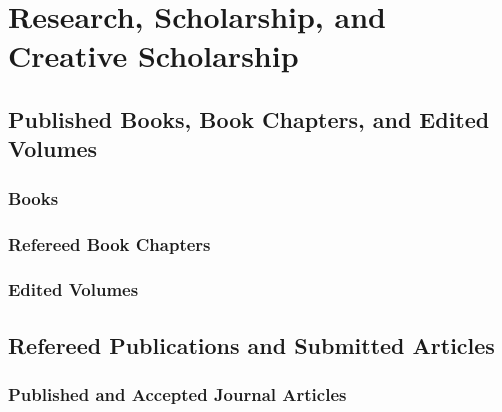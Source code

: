 \section{Research, Scholarship, and Creative Scholarship}
\label{sec:research}

\subsection{Published Books, Book Chapters, and Edited Volumes}
    \subsubsection{Books}\label{subsec:book}
        \begin{bibunit}[unsrtcv]
            \nocite{book_2018}
            \putbib[biblio]
        \end{bibunit}

    \subsubsection{Refereed Book Chapters}
    \label{subsec:chap}
        \begin{bibunit}[unsrtcv]
            \nocite{chapter_2018}
            \putbib[biblio]
        \end{bibunit}

    \subsubsection{Edited Volumes}\label{subsec:edited}
        \begin{bibunit}[unsrtcv]
            \nocite{edited_2018}
            \putbib[biblio]
        \end{bibunit}

\subsection{Refereed Publications and Submitted Articles}
    \subsubsection{Published and Accepted Journal Articles}\label{subsec:journals}
        \begin{bibunit}[unsrtcv]
            \nocite{journal_2018}
            \putbib[biblio]
        \end{bibunit}

